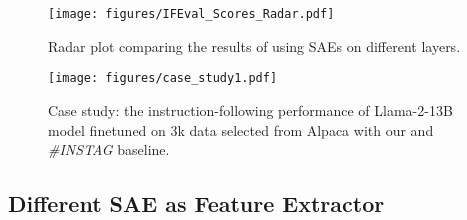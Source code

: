 \begin{table}[h]
    \centering
    \caption{Preference evaluation results on AlpacaEval 2.0. '-' represents not available.}\label{tab: leadboard}
\end{table}

\begin{figure}[h]
\centering
\texttt{[image: figures/IFEval\_Scores\_Radar.pdf]}
\caption{Radar plot comparing the results of using SAEs on different layers.}\label{fig: different_layer}
\end{figure} 

\begin{figure}[h]
\centering
\texttt{[image: figures/case\_study1.pdf]}
\caption{Case study: the
instruction-following performance of Llama-2-13B model finetuned
on $3$k data selected from Alpaca with our \one and \textit{\#INSTAG} baseline.}\label{fig: case_study}
\end{figure} 


\subsection{Different SAE as Feature Extractor}

